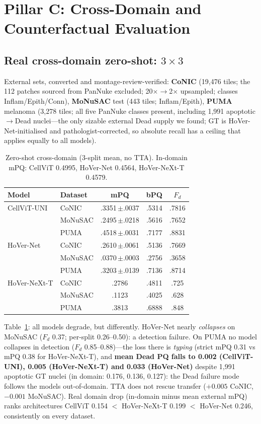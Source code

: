 \documentclass[11pt]{article}
\begin{document}
\section{Pillar C: Cross-Domain and Counterfactual Evaluation}
\label{sec:pillarC}

\subsection{Real cross-domain zero-shot: $3{\times}3$}
\label{sec:external}

External sets, converted and montage-review-verified: \textbf{CoNIC} (19,476 tiles; the 112
patches sourced from PanNuke excluded; 20$\times\rightarrow$2$\times$ upsampled; classes
Inflam/Epith/Conn), \textbf{MoNuSAC} test (443 tiles; Inflam/Epith), \textbf{PUMA} melanoma
(3,278 tiles; all five PanNuke classes present, including 1,991 apoptotic$\rightarrow$Dead
nuclei---the only sizable external Dead supply we found; GT is HoVer-Net-initialised and
pathologist-corrected, so absolute recall has a ceiling that applies equally to all models).

\begin{table}[t]
\centering\small
\caption{Zero-shot cross-domain (3-split mean, no TTA). In-domain mPQ: CellViT 0.4995,
HoVer-Net 0.4564, HoVer-NeXt-T 0.4579.}
\label{tab:external}
\begin{tabular}{llccc}
\toprule
Model & Dataset & mPQ & bPQ & $F_d$ \\
\midrule
CellViT-UNI  & CoNIC   & .3351\,$\pm$.0037 & .5314 & .7816 \\
             & MoNuSAC & .2495\,$\pm$.0218 & .5616 & .7652 \\
             & PUMA    & .4518\,$\pm$.0031 & .7177 & .8831 \\
\midrule
HoVer-Net    & CoNIC   & .2610\,$\pm$.0061 & .5136 & .7669 \\
             & MoNuSAC & .0370\,$\pm$.0003 & .2756 & .3658 \\
             & PUMA    & .3203\,$\pm$.0139 & .7136 & .8714 \\
\midrule
HoVer-NeXt-T & CoNIC   & .2786 & .4811 & .725 \\
             & MoNuSAC & .1123 & .4025 & .628 \\
             & PUMA    & .3813 & .6888 & .848 \\
\bottomrule
\end{tabular}
\end{table}

Table~\ref{tab:external}: all models degrade, but differently. HoVer-Net nearly
\emph{collapses} on MoNuSAC ($F_d$ 0.37; per-split 0.26--0.50): a detection failure.
On PUMA no model collapses in detection ($F_d$ 0.85--0.88)---the loss there is \emph{typing}
(strict mPQ 0.31 vs mPQ 0.38 for HoVer-NeXt-T), and \textbf{mean Dead PQ falls to 0.002
(CellViT-UNI), 0.005 (HoVer-NeXt-T) and 0.033 (HoVer-Net)} despite 1,991 apoptotic GT nuclei
(in domain: 0.176, 0.136, 0.127): the Dead failure mode follows the models out-of-domain. TTA does not rescue transfer ($+0.005$ CoNIC, $-0.001$ MoNuSAC). Real domain
drop (in-domain minus mean external mPQ) ranks architectures CellViT 0.154 $<$ HoVer-NeXt-T
0.199 $<$ HoVer-Net 0.246, consistently on every dataset.
\end{document}
